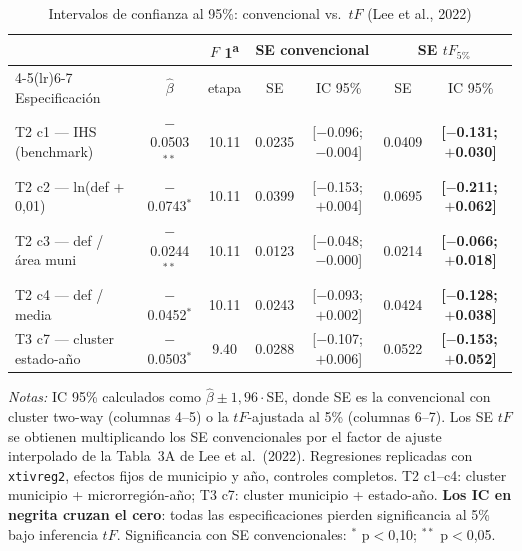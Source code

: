 \begin{table}[!htbp]
  \centering
  \footnotesize
  \setlength{\tabcolsep}{4pt}
  \caption{Intervalos de confianza al 95\%: convencional vs.\ $tF$ (Lee et al., 2022)}
  \label{tab:tF_inference_CI}
  \begin{tabular}{lcccccc}
    \toprule
                   &              & $F$ 1\textsuperscript{a} & \multicolumn{2}{c}{SE convencional} & \multicolumn{2}{c}{SE $tF_{5\%}$} \\
    \cmidrule(lr){4-5}\cmidrule(lr){6-7}
    Especificación & $\hat\beta$  & etapa                    & SE      & IC 95\%                & SE      & IC 95\% \\
    \midrule
    T2 c1 — IHS (benchmark) & $-$0.0503$^{**}$ & 10.11 & 0.0235 & [$-$0.096;\,$-$0.004] & 0.0409 & \textbf{[$-$0.131;\,$+$0.030]} \\
    T2 c2 — ln(def + 0{,}01) & $-$0.0743$^{*}$ & 10.11 & 0.0399 & [$-$0.153;\,$+$0.004] & 0.0695 & \textbf{[$-$0.211;\,$+$0.062]} \\
    T2 c3 — def / área muni & $-$0.0244$^{**}$ & 10.11 & 0.0123 & [$-$0.048;\,$-$0.000] & 0.0214 & \textbf{[$-$0.066;\,$+$0.018]} \\
    T2 c4 — def / media & $-$0.0452$^{*}$ & 10.11 & 0.0243 & [$-$0.093;\,$+$0.002] & 0.0424 & \textbf{[$-$0.128;\,$+$0.038]} \\
    T3 c7 — cluster estado-año & $-$0.0503$^{*}$ & 9.40 & 0.0288 & [$-$0.107;\,$+$0.006] & 0.0522 & \textbf{[$-$0.153;\,$+$0.052]} \\
    \bottomrule
  \end{tabular}
  \begin{minipage}{0.95\linewidth}
    \vspace{4pt}\scriptsize
    \textit{Notas:} IC 95\% calculados como $\hat\beta \pm 1{,}96 \cdot \text{SE}$, donde
    SE es la convencional con cluster two-way (columnas 4--5) o la $tF$-ajustada al 5\%
    (columnas 6--7). Los SE $tF$ se obtienen multiplicando los SE convencionales por el
    factor de ajuste interpolado de la Tabla~3A de Lee et al.\ (2022). Regresiones
    replicadas con \texttt{xtivreg2}, efectos fijos de municipio y año, controles
    completos. T2 c1--c4: cluster municipio + microrregión-año; T3 c7: cluster municipio
    + estado-año. \textbf{Los IC en negrita cruzan el cero}: todas las especificaciones
    pierden significancia al 5\% bajo inferencia $tF$. Significancia con SE convencionales:
    $^*$ p$<$0{,}10; $^{**}$ p$<$0{,}05.
  \end{minipage}
\end{table}
